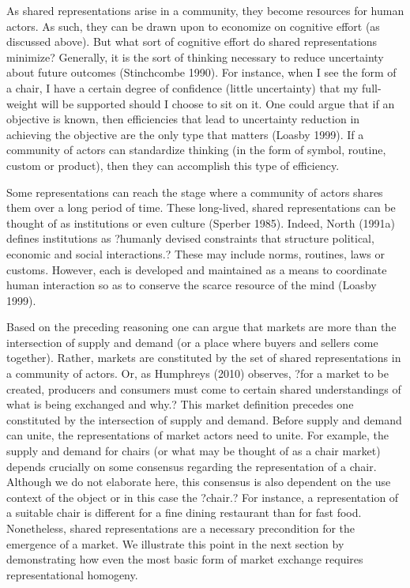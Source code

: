 As shared representations arise in a community, they become resources for human actors. As such, they can be drawn upon to economize on cognitive effort (as discussed above). But what sort of cognitive effort do shared representations minimize? Generally, it is the sort of thinking necessary to reduce uncertainty about future outcomes (Stinchcombe 1990). For instance, when I see the form of a chair, I have a certain degree of confidence (little uncertainty) that my full-weight will be supported should I choose to sit on it. One could argue that if an objective is known, then efficiencies that lead to uncertainty reduction in achieving the objective are the only type that matters (Loasby 1999). If a community of actors can standardize thinking (in the form of symbol, routine, custom or product), then they can accomplish this type of efficiency. 

Some representations can reach the stage where a community of actors shares them over a long period of time. These long-lived, shared representations can be thought of as institutions or even culture (Sperber 1985). Indeed, North (1991a) defines institutions as ?humanly devised constraints that structure political, economic and social interactions.?  These may include norms, routines, laws or customs. However, each is developed and maintained as a means to coordinate human interaction so as to conserve the scarce resource of the mind (Loasby 1999). 

Based on the preceding reasoning one can argue that markets are more than the intersection of supply and demand (or a place where buyers and sellers come together).  Rather, markets are constituted by the set of shared representations in a community of actors. Or, as Humphreys (2010) observes, ?for a market to be created, producers and consumers must come to certain shared understandings of what is being exchanged and why.? This market definition precedes one constituted by the intersection of supply and demand. Before supply and demand can unite, the representations of market actors need to unite. For example, the supply and demand for chairs (or what may be thought of as a chair market) depends crucially on some consensus regarding the representation of a chair. Although we do not elaborate here, this consensus is also dependent on the use context of the object or in this case the ?chair.? For instance, a representation of a suitable chair is different for a fine dining restaurant than for fast food. Nonetheless, shared representations are a necessary precondition for the emergence of a market. We illustrate this point in the next section by demonstrating how even the most basic form of market exchange requires representational homogeny. 


